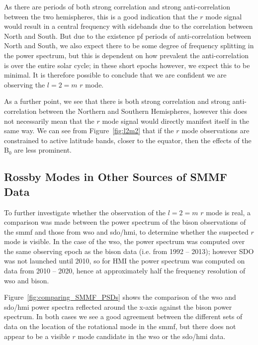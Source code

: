 As there are periods of both strong correlation and strong anti-correlation between the two hemispheres, this is a good indication that the $r$ mode signal would result in a central frequency with sidebands due to the correlation between North and South. But due to the existence pf periods of anti-correlation between North and South, we also expect there to be some degree of frequency splitting in the power spectrum, but this is dependent on how prevalent the anti-correlation is over the entire solar cycle; in these short epochs however, we expect this to be minimal. It is therefore possible to conclude that we are confident we are observing the $l=2=m$ $r$ mode.

As a further point, we see that there is both strong correlation and strong anti-correlation between the Northern and Southern Hemispheres, however this does not necessarily mean that the $r$ mode signal would directly manifest itself in the same way. We can see from Figure~\ref{fig:l2m2} that if the $r$ mode observations are constrained to active latitude bands, closer to the equator, then the effects of the B$_0$ are less prominent.

\subsection{Rossby Modes in Other Sources of SMMF Data}

To further investigate whether the observation of the  $l=2=m$ $r$ mode is real, a comparison was made between the power spectrum of the \gls{bison} observations of the \gls{smmf} and those from \gls{wso} and \gls{sdo/hmi}, to determine whether the suspected $r$ mode is visible. In the case of the \gls{wso}, the power spectrum was computed over the same observing epoch as the \gls{bison} data (i.e. from 1992 -- 2013); however SDO was not launched until 2010, so for HMI the power spectrum was computed on data from 2010 -- 2020, hence at approximately half the frequency resolution of \gls{wso} and \gls{bison}.

Figure~\ref{fig:comparing_SMMF_PSDs} shows the comparison of the \gls{wso} and \gls{sdo/hmi} power spectra reflected around the x-axis against the \gls{bison} power spectrum. In both cases we see a good agreement between the different sets of data on the location of the rotational mode in the \gls{smmf}, but there does not appear to be a visible $r$ mode candidate in the \gls{wso} or the \gls{sdo/hmi} data.

